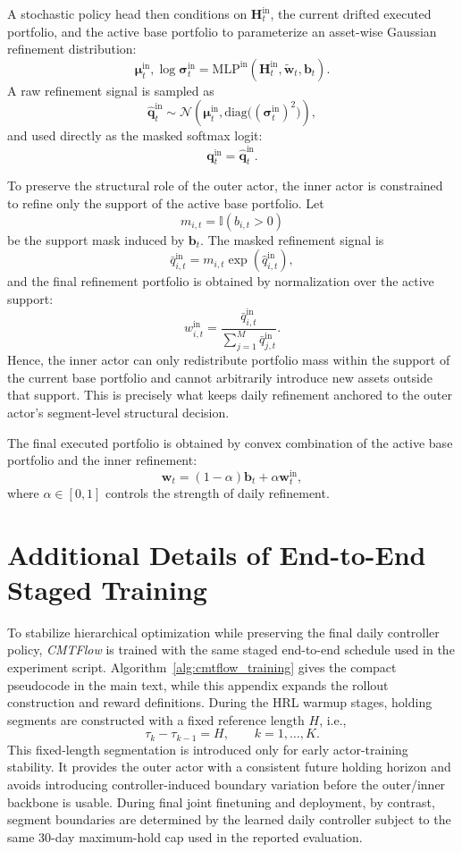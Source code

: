 \documentclass[letterpaper]{article} %
\begin{document}
A stochastic policy head then conditions on \(\mathbf{H}^{\mathrm{in}}_t\), the current drifted executed portfolio, and the active base portfolio to parameterize an asset-wise Gaussian refinement distribution:
\[
\boldsymbol{\mu}^{\mathrm{in}}_t,\log \boldsymbol{\sigma}^{\mathrm{in}}_t
=
\mathrm{MLP}^{\mathrm{in}}\!\left(
\mathbf{H}^{\mathrm{in}}_t,
\tilde{\mathbf{w}}_t,
\mathbf{b}_t
\right).
\]
A raw refinement signal is sampled as
\[
\hat{\mathbf{q}}^{\mathrm{in}}_t
\sim
\mathcal{N}\!\left(
\boldsymbol{\mu}^{\mathrm{in}}_t,
\mathrm{diag}\bigl((\boldsymbol{\sigma}^{\mathrm{in}}_t)^2\bigr)
\right),
\]
and used directly as the masked softmax logit:
\[
\mathbf{q}^{\mathrm{in}}_t
=
\hat{\mathbf{q}}^{\mathrm{in}}_t.
\]

To preserve the structural role of the outer actor, the inner actor is constrained to refine only the support of the active base portfolio. Let
\[
m_{i,t}
=
\mathbb{I}\!\left(b_{i,t}>0\right)
\]
be the support mask induced by \(\mathbf{b}_t\). The masked refinement signal is
\[
\bar{q}_{i,t}^{\mathrm{in}}
=
m_{i,t}\exp(\hat{q}_{i,t}^{\mathrm{in}}),
\]
and the final refinement portfolio is obtained by normalization over the active support:
\[
w_{i,t}^{\mathrm{in}}
=
\frac{\bar{q}_{i,t}^{\mathrm{in}}}
{\sum_{j=1}^{M}\bar{q}_{j,t}^{\mathrm{in}}}.
\]
Hence, the inner actor can only redistribute portfolio mass within the support of the current base portfolio and cannot arbitrarily introduce new assets outside that support. This is precisely what keeps daily refinement anchored to the outer actor's segment-level structural decision.

The final executed portfolio is obtained by convex combination of the active base portfolio and the inner refinement:
\[
\mathbf{w}_t
=
(1-\alpha)\mathbf{b}_t
+
\alpha\mathbf{w}^{\mathrm{in}}_t,
\]
where \(\alpha\in[0,1]\) controls the strength of daily refinement.

\section{Additional Details of End-to-End Staged Training}
\label{app:hier_training}

To stabilize hierarchical optimization while preserving the final daily controller policy, \textit{CMTFlow} is trained with the same staged end-to-end schedule used in the experiment script. Algorithm~\ref{alg:cmtflow_training} gives the compact pseudocode in the main text, while this appendix expands the rollout construction and reward definitions. During the HRL warmup stages, holding segments are constructed with a fixed reference length \(H\), i.e.,
\[
\tau_k-\tau_{k-1}=H,\qquad k=1,\dots,K.
\]
This fixed-length segmentation is introduced only for early actor-training stability. It provides the outer actor with a consistent future holding horizon and avoids introducing controller-induced boundary variation before the outer/inner backbone is usable. During final joint finetuning and deployment, by contrast, segment boundaries are determined by the learned daily controller subject to the same 30-day maximum-hold cap used in the reported evaluation.
\end{document}
